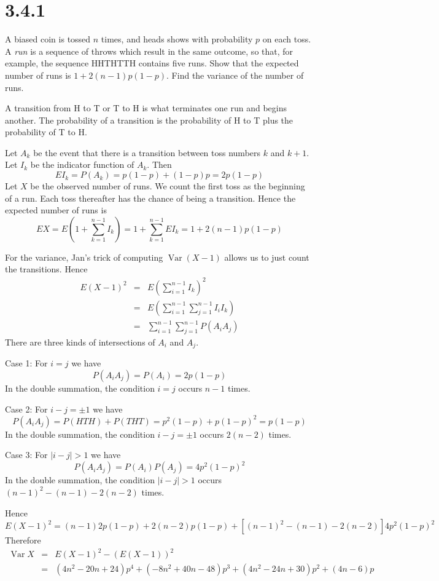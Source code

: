 \section*{3.4.1}
A biased coin is tossed $n$ times, and heads shows with probability
$p$ on each toss. A {\it run} is a sequence of throws which result
in the same outcome, so that, for example, the sequence HHTHTTH
contains five runs. Show that the expected number of runs is
$1+2(n-1)p(1-p)$. Find the variance of the number of runs.

\bigskip
\noindent
A transition from H to T or T to H is what terminates one run and
begins another.
The probability of a transition is the probability of H to T
plus the probability of T to H.

\bigskip
\noindent
Let $A_k$ be the event that there is a transition between toss
numbers $k$ and $k+1$.
Let $I_k$ be the indicator function of $A_k$.
Then
$$EI_k=P(A_k)=p(1-p)+(1-p)p=2p(1-p)$$
Let $X$ be the observed number of runs.
We count the first toss as the beginning of a run.
Each toss thereafter has the chance of being a transition.
Hence the expected number of runs is
$$EX=E\left(1+\sum_{k=1}^{n-1}I_k\right)
=1+\sum_{k=1}^{n-1}EI_k=1+2(n-1)p(1-p)$$

\bigskip
\noindent
For the variance, Jan's trick of computing
$\mathop{Var}(X-1)$
allows us to just count the transitions.
Hence
\begin{eqnarray*}
E(X-1)^2
&=&E\left(\sum_{i=1}^{n-1}I_k\right)^2\\
&=&E\left(\sum_{i=1}^{n-1}\sum_{j=1}^{n-1}I_iI_k\right)\\
&=&\sum_{i=1}^{n-1}\sum_{j=1}^{n-1}P(A_iA_j)
\end{eqnarray*}
There are three kinds of intersections of $A_i$ and $A_j$.

\bigskip
\noindent
Case 1: For $i=j$ we have
$$P(A_iA_j)=P(A_i)=2p(1-p)$$
In the double summation, the condition $i=j$ occurs $n-1$ times.

\bigskip
\noindent
Case 2: For $i-j=\pm1$ we have
$$P(A_iA_j)=P(HTH)+P(THT)=p^2(1-p)+p(1-p)^2=p(1-p)$$
In the double summation, the condition $i-j=\pm1$
occurs $2(n-2)$ times.

\bigskip
\noindent
Case 3: For $|i-j|>1$ we have
$$P(A_iA_j)=P(A_i)P(A_j)=4p^2(1-p)^2$$
In the double summation, the condition $|i-j|>1$ occurs
$(n-1)^2-(n-1)-2(n-2)$ times.

\bigskip
\noindent
Hence
$$E(X-1)^2=
(n-1)2p(1-p)+2(n-2)p(1-p)+[(n-1)^2-(n-1)-2(n-2)]4p^2(1-p)^2$$
Therefore
\begin{eqnarray*}
\mathop{Var}X
&=&E(X-1)^2-(E(X-1))^2\\
&=&(4n^2-20n+24)p^4+(-8n^2+40n-48)p^3+(4n^2-24n+30)p^2+(4n-6)p
\end{eqnarray*}
